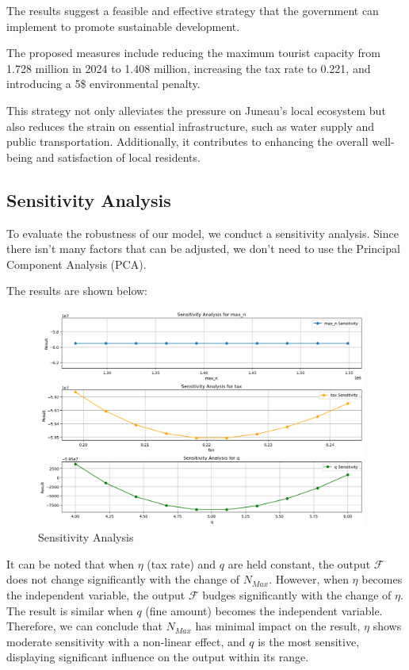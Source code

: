 The results suggest a feasible and effective strategy that the government can implement to promote sustainable development. 

The proposed measures include reducing the maximum tourist capacity from 1.728 million in 2024 to 1.408 million, increasing the tax rate to 0.221, and introducing a 5\$ environmental penalty. 

This strategy not only alleviates the pressure on Juneau's local ecosystem but also reduces the strain on essential infrastructure, such as water supply and public transportation. Additionally, it contributes to enhancing the overall well-being and satisfaction of local residents.

\subsection{Sensitivity Analysis}

To evaluate the robustness of our model, we conduct a sensitivity analysis.
Since there isn't many factors that can be adjusted, we don't need to use the Principal Component Analysis (PCA).

The results are shown below:

\begin{figure}[H]
    \centering
    \includegraphics[width=0.97\textwidth]{Sensitivity_Analysis.png} %
    \vspace{-0.3cm}
    \caption{Sensitivity Analysis}
\end{figure}

It can be noted that when $\eta$ (tax rate) and $q$ are held constant, 
the output $\mathcal{F}$ does not change significantly with the change of $N_{Max}$.
However, when $\eta$ becomes the independent variable, the output $\mathcal{F}$
budges significantly with the change of $\eta$. The result is similar when $q$ (fine amount) becomes the independent variable.
Therefore, we can conclude that $N_{Max}$ has minimal impact on the result, 
$\eta$ shows moderate sensitivity with a non-linear effect, 
and $q$ is the most sensitive, displaying significant influence on 
the output within its range.